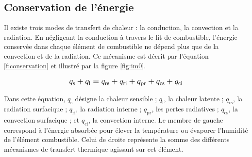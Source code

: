 \documentclass[12pt, oneside]{report} %
\theoremstyle{definition}
\theoremstyle{remark}
\begin{document}
		\subsection{Conservation de l'énergie}
Il existe trois modes de transfert de chaleur : la conduction, la convection et la radiation. En négligeant la conduction à travers le lit de combustible, l’énergie conservée dans chaque élément de combustible ne dépend plus que de la convection et de la radiation. Ce mécanisme est décrit par l’équation \eqref{f:conservation} et illustré par la figure \eqref{fig:im0}.

\begin{equation}\label{f:conservation}
	\large\begin{aligned}
		q_{\text{s}} + q_{\text{l}} = q_{\text{rs}}  + q_{\text{ri}} + q_{\text{pr}}+ q_{\text{cs}} + q_{\text{ci}}
	\end{aligned}
\end{equation}

Dans cette équation, $q_{\text{s}}$ désigne la chaleur sensible ; $q_{\text{l}}$, la chaleur latente ; $q_{\text{rs}}$, la radiation surfacique ; $q_{\text{ri}}$, la radiation interne ; $q_{\text{pr}}$, les pertes radiatives ; $q_{\text{cs}}$, la convection surfacique ; et $q_{\text{ci}}$, la convection interne. Le membre de gauche correspond à l’énergie absorbée pour élever la température ou évaporer l’humidité de l’élément combustible. Celui de droite représente la somme des différents mécanismes de transfert thermique agissant sur cet élément.
		
\end{document}
